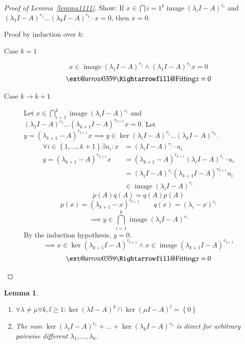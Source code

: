 \documentclass{article}
\makeatletter
\newtheorem{lemma}{Lemma}  \numberwithin{lemma}{section}
\newcommand{\set}[1]{\left\{#1\right\}}
\newcommand{\xRightarrow}[2][]{\ext@arrow 0359\Rightarrowfill@{#1}{#2}}
\DeclareMathOperator{\im}{image}
\makeatother
\begin{document}
\begin{proof}[Proof of Lemma~\ref{lemma1111}]
  Show: If $x \in \bigcap{i=1}^k \im(\lambda_i I - A)^{r_i}$ and $(\lambda_1 I - A)^{r_1} \dots (\lambda_k I - A)^{r_k} \cdot x = 0$, then $x = 0$.

  Proof by induction over $k$:
  \begin{description}
    \item[Case $k=1$]
      \[ x \in \im(\lambda_1 I - A)^{r_1} \land (\lambda_1 I - A)^{r_1} x = 0 \]
      \[ \xRightarrow{\text{Fitting}} x = 0 \]
    \item[Case $k \to k+1$]
      Let $x \in \bigcap_{i=1}^k \im(\lambda_i I - A)^{r_i}$ and $(\lambda_1 I - A)^{r_1} \dots (\lambda_{k+1} I - A)^{r_{k+1}} x = 0$.
      Let $y = (\lambda_{k+1} - A)^{r_{k+1}} x \implies y \in \ker(\lambda_i I - A)^{r_i} \dots (\lambda_k I - A)^{r_k}$.
      \begin{align*}
        \forall i \in \set{1, \dots, k+1} \exists u_i: x &= (\lambda_i I - A)^{r_i} \cdot u_i \\
        y = (\lambda_{k+1} - A)^{r_{k+1}} x &= (\lambda_{k+1} - A)^{r_{k+1}} (\lambda_i I - A)^{r_i} \cdot u_i \\
          &= (\lambda_i I - A)^{r_i} (\lambda_{k+1} I - A)^{r_{k+1}} u_i \\
          &\in \im(\lambda_i I - A)^{r_i}
      \end{align*}
      \[ p(A) q(A) = q(A) p(A) \]
      \[ p(x) = (\lambda_{k+1} - x)^{r_{k+1}} \qquad q(x) = (\lambda_i - x)^{r_i} \]
      \[ \implies y \in \bigcap_{i=1}^{k} \im(\lambda_i I - A)^{r_i} \]
      By the induction hypothesis, $y = 0$.
      \[ \implies x \in \ker(\lambda_{k+1} I - A)^{r_{k+1}} \land x \in \im(\lambda_{k+1} I - A)^{r_{k+1}} \]
      \[ \xRightarrow{\text{Fitting}} x = 0 \]
  \end{description}
\end{proof}

\begin{lemma} %
  \label{le1113}
  \begin{enumerate}
    \item $\forall \lambda \neq \mu \forall k,l \geq 1: \ker(\lambda I - A)^k \cap \ker(\mu I - A)^l = \set{0}$
    \item The sum $\ker(\lambda_i I - A)^{r_1} + \dots + \ker(\lambda_k I - A)^{r_k}$ is direct for arbitrary pairwise different $\lambda_1, \dots, \lambda_k$.
  \end{enumerate}
\end{lemma}
\end{document}
